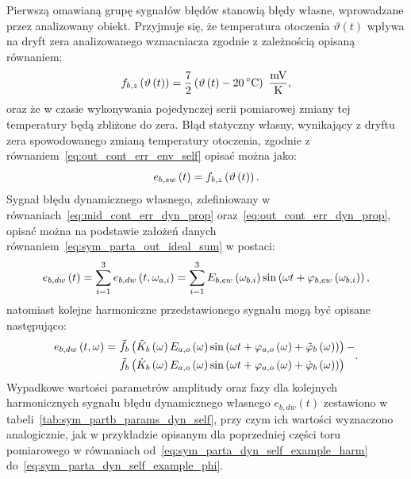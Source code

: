 Pierwszą omawianą grupę sygnałów błędów stanowią błędy własne, wprowadzane przez analizowany obiekt. Przyjmuje się, że temperatura otoczenia $\vartheta(t)$ wpływa na dryft zera analizowanego wzmacniacza zgodnie z zależnością opisaną równaniem:
\begin{equation}
f_{b,z} \left( \vartheta \emb{t} \right) = \frac{7}{2} \left( \vartheta \emb{t} - \qty{20}{\degreeCelsius} \right)~\unit{\frac{mV}{K}} \label{eq:sym_partb_temp_err},
\end{equation}
oraz że w czasie wykonywania pojedynczej serii pomiarowej zmiany tej temperatury będą zbliżone do zera. Błąd statyczny własny, wynikający z dryftu zera spowodowanego zmianą temperatury otoczenia, zgodnie z równaniem~\eqref{eq:out_cont_err_env_self} opisać można jako:
\begin{equation}
e_{b,sw} \left(t\right) = f_{b,z} \left( \vartheta \left(t\right) \right) \label{eq:sym_partb_err_sw}.
\end{equation}
Sygnał błędu dynamicznego własnego, zdefiniowany w równaniach~\eqref{eq:mid_cont_err_dyn_prop} oraz~\eqref{eq:out_cont_err_dyn_prop}, opisać można na podstawie założeń danych równaniem~\eqref{eq:sym_parta_out_ideal_sum} w postaci:
\begin{equation}
e_{b,dw} \left(t\right) = \sum _{i = 1} ^{3} e_{b,dw} \left(t,\omega_{a,i}\right) = \sum _{i = 1} ^{3} E_{b,ew} \left(\omega_{b,i}\right) \sin \left(\omega t + \varphi_{b,ew} \left(\omega_{b,i}\right)\right) \label{eq:sym_partb_dyn_self_sum},
\end{equation}
natomiast kolejne harmoniczne przedstawionego sygnału mogą być opisane następująco:
\begin{equation}
\begin{split}
e_{b,dw} \left(t,\omega\right) =~
& \tilde{f}_{b} \left( \tilde{K}_{b} \left(\omega\right) E_{a,o} \left(\omega\right) \sin \left( \omega t + \varphi_{a,o} \left(\omega\right) + \tilde{\varphi}_{b} \left(\omega\right) \right) \right)- \\
& \tilde{f}_{b} \left( \dot{K}_{b} \left(\omega\right) E_{a,o} \left(\omega\right) \sin \left( \omega t + \varphi_{a,o} \left(\omega\right) + \dot{\varphi}_{b} \left(\omega\right) \right) \right)
\end{split}
\label{eq:sym_partb_dyn_self_err}.
\end{equation}
Wypadkowe wartości parametrów amplitudy oraz fazy dla kolejnych harmonicznych sygnału błędu dynamicznego własnego $e_{b,dw}(t)$ zestawiono w tabeli~\ref{tab:sym_partb_params_dyn_self}, przy czym ich wartości wyznaczono analogicznie, jak w przykładzie opisanym dla poprzedniej części toru pomiarowego w równaniach od~\eqref{eq:sym_parta_dyn_self_example_harm} do~\eqref{eq:sym_parta_dyn_self_example_phi}.

